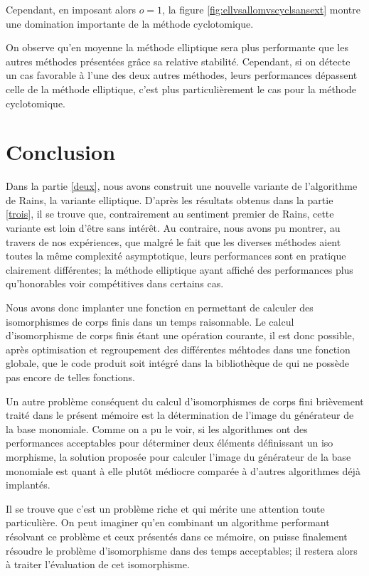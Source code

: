 \documentclass[a4paper]{article} %
\numberwithin{section}{part}
\numberwithin{equation}{section}
\begin{document}
Cependant, en imposant alors $o = 1$, la figure 
\ref{fig:ellvsallomvscyclsansext}
montre une domination importante de la méthode cyclotomique.


On observe qu'en moyenne la méthode elliptique sera plus performante que les 
autres méthodes présentées grâce sa relative stabilité. Cependant, si on 
détecte un cas favorable à l'une des deux autres méthodes, leurs performances 
dépassent celle de la méthode elliptique, c'est plus particulièrement le cas 
pour la méthode cyclotomique.\par


\newpage
\part{Conclusion}
\label{quatre}
Dans la partie \ref{deux}, nous avons construit une nouvelle variante de 
l'algorithme de Rains, la variante elliptique. D'après les résultats obtenus 
dans la partie \ref{trois}, il se trouve que, contrairement au sentiment premier
de Rains, cette variante est loin d'être sans intérêt. Au contraire, nous avons
pu montrer, au travers de nos expériences, que malgré le fait que les diverses
méthodes aient toutes la même complexité asymptotique, leurs performances sont
en pratique clairement différentes; la méthode elliptique ayant affiché des
performances plus qu'honorables voir compétitives dans certains
cas.\par
Nous avons donc implanter une fonction en  permettant de calculer des 
isomorphismes de corps finis dans un temps raisonnable. Le calcul d'isomorphisme
de corps finis étant une opération courante, il est donc possible, après 
optimisation et regroupement des différentes méhtodes dans une fonction
globale, que le code produit soit intégré dans la bibliothèque de  
qui ne possède pas encore de telles fonctions.\par

\vspace{0.3cm}

Un autre problème conséquent du calcul d'isomorphismes de corps fini brièvement
traité dans le présent mémoire est la détermination de l'image du générateur de 
la base monomiale. Comme on a pu le voir, si les algorithmes ont des 
performances acceptables pour déterminer deux éléments définissant un iso
morphisme, la solution proposée pour calculer l'image du générateur de la base 
monomiale est quant à elle plutôt médiocre comparée à d'autres algorithmes déjà 
implantés.\par
Il se trouve que c'est un problème riche et qui mérite une attention toute
particulière. On peut imaginer qu'en combinant un algorithme performant
résolvant ce problème et ceux présentés dans ce mémoire, on puisse finalement
résoudre le problème d'isomorphisme dans des temps acceptables; il restera alors
à traiter l'évaluation de cet isomorphisme.
\newpage
\end{document}
